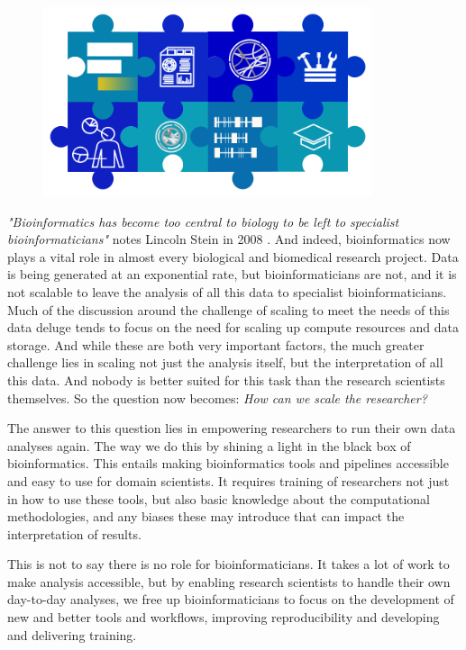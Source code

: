 \begin{figure}[t!]
\includegraphics[height=15em]{frontmatter/images/chapter-header-discussion-tools.png}
\end{figure}
\setcounter{figure}{-1}
\setcounter{table}{-1}
\setcounter{section}{-1}


\emph{"Bioinformatics has become too central to biology to be left to specialist bioinformaticians"} notes Lincoln Stein in 2008 \cite{stein2008bioinformatics}.
And indeed, bioinformatics now plays a vital role in almost every biological and biomedical research project.
Data is being generated at an exponential rate, but bioinformaticians are not,  and it is not scalable to leave the analysis of all this data to specialist bioinformaticians.
Much of the discussion around the challenge of scaling to meet the needs of this data deluge tends to focus on the need for scaling up compute resources and data storage.
And while these are both very important factors, the much greater challenge lies in scaling not just the analysis itself, but the interpretation of all this data.
And nobody is better suited for this task than the research scientists themselves. So the question now becomes: \emph{How can we scale the researcher?}

The answer to this question lies in empowering researchers to run their own data analyses again.
The way we do this by shining a light in the black box of bioinformatics.
This entails making bioinformatics tools and pipelines accessible and easy to use for domain scientists.
It requires training of researchers not just in how to use these tools, but also basic knowledge about the computational methodologies, and any biases these may introduce that can impact the interpretation of results.

This is not to say there is no role for bioinformaticians. It takes a lot of work to make analysis accessible, but by enabling research scientists to handle their own day-to-day analyses, we free up bioinformaticians to focus on the development of new and better tools and workflows, improving reproducibility and developing and delivering training.

